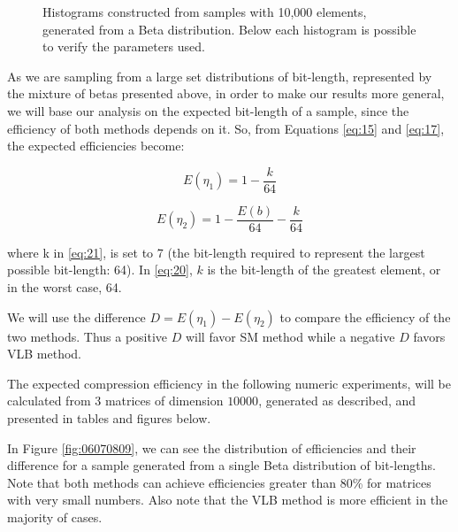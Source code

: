 \documentclass[10pt]{article}
\begin{document}
\begin{figure}[ht]
{  }
  \caption{Histograms constructed from samples with 10,000 elements, generated from a Beta distribution. Below each histogram is possible to verify the parameters used.}
  \label{fig:01020304}
\end{figure}

As we are sampling from a large set distributions of bit-length, represented by the mixture of betas presented above, in order to make our results more general, we will base our analysis on the expected bit-length of a sample, since the efficiency of both methods depends on it. So, from Equations \ref{eq:15} and \ref{eq:17}, the expected efficiencies become: 
 
\begin{equation}\label{eq:20}
 E(\eta_1) = 1 - \frac{k}{64}
\end{equation}

\begin{equation}\label{eq:21}
 E(\eta_2) = 1 - \frac{E(b)}{64} - \frac{k}{64}
\end{equation}

\noindent where k in \ref{eq:21}, is set to 7 (the bit-length required to represent the largest possible bit-length: 64). In \ref{eq:20}, $k$ is the bit-length of the greatest element, or in the worst case, 64.

We will use the difference $D=E(\eta_1)-E(\eta_2)$ to compare the efficiency of the two methods. Thus a positive $D$ will favor SM method while a negative $D$ favors VLB method.

The expected compression efficiency in the following numeric experiments, will be calculated from $3$ matrices of dimension $10000$, generated as described, and presented in tables and figures below. 
 
In Figure \ref{fig:06070809}, we can see the distribution of efficiencies and their difference for a sample generated from a single Beta distribution of bit-lengths. Note that both methods can achieve efficiencies greater than 80\% for matrices with very small numbers. Also note that the VLB method is more efficient in the majority of cases.
 
\end{document}
